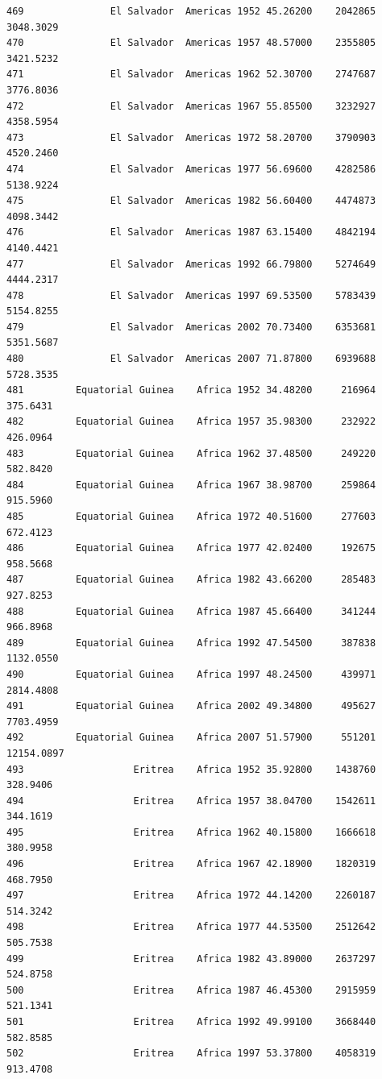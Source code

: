 \documentclass[
  letterpaper,
  DIV=11,
  numbers=noendperiod]{scrreprt}
\begin{document}
\begin{verbatim}
469               El Salvador  Americas 1952 45.26200    2042865   3048.3029
470               El Salvador  Americas 1957 48.57000    2355805   3421.5232
471               El Salvador  Americas 1962 52.30700    2747687   3776.8036
472               El Salvador  Americas 1967 55.85500    3232927   4358.5954
473               El Salvador  Americas 1972 58.20700    3790903   4520.2460
474               El Salvador  Americas 1977 56.69600    4282586   5138.9224
475               El Salvador  Americas 1982 56.60400    4474873   4098.3442
476               El Salvador  Americas 1987 63.15400    4842194   4140.4421
477               El Salvador  Americas 1992 66.79800    5274649   4444.2317
478               El Salvador  Americas 1997 69.53500    5783439   5154.8255
479               El Salvador  Americas 2002 70.73400    6353681   5351.5687
480               El Salvador  Americas 2007 71.87800    6939688   5728.3535
481         Equatorial Guinea    Africa 1952 34.48200     216964    375.6431
482         Equatorial Guinea    Africa 1957 35.98300     232922    426.0964
483         Equatorial Guinea    Africa 1962 37.48500     249220    582.8420
484         Equatorial Guinea    Africa 1967 38.98700     259864    915.5960
485         Equatorial Guinea    Africa 1972 40.51600     277603    672.4123
486         Equatorial Guinea    Africa 1977 42.02400     192675    958.5668
487         Equatorial Guinea    Africa 1982 43.66200     285483    927.8253
488         Equatorial Guinea    Africa 1987 45.66400     341244    966.8968
489         Equatorial Guinea    Africa 1992 47.54500     387838   1132.0550
490         Equatorial Guinea    Africa 1997 48.24500     439971   2814.4808
491         Equatorial Guinea    Africa 2002 49.34800     495627   7703.4959
492         Equatorial Guinea    Africa 2007 51.57900     551201  12154.0897
493                   Eritrea    Africa 1952 35.92800    1438760    328.9406
494                   Eritrea    Africa 1957 38.04700    1542611    344.1619
495                   Eritrea    Africa 1962 40.15800    1666618    380.9958
496                   Eritrea    Africa 1967 42.18900    1820319    468.7950
497                   Eritrea    Africa 1972 44.14200    2260187    514.3242
498                   Eritrea    Africa 1977 44.53500    2512642    505.7538
499                   Eritrea    Africa 1982 43.89000    2637297    524.8758
500                   Eritrea    Africa 1987 46.45300    2915959    521.1341
501                   Eritrea    Africa 1992 49.99100    3668440    582.8585
502                   Eritrea    Africa 1997 53.37800    4058319    913.4708

\end{verbatim}
\end{document}
